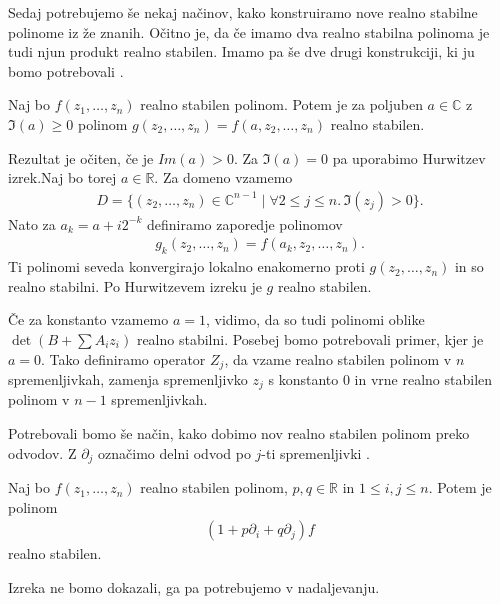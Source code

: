 Sedaj potrebujemo še nekaj načinov, kako konstruiramo nove realno stabilne polinome iz že znanih. Očitno je, da če imamo dva realno stabilna polinoma je tudi njun produkt realno stabilen. Imamo pa še dve drugi konstrukciji, ki ju bomo potrebovali \cite{wagner-multivariate}.
\begin{izrek}
    Naj bo \(f(z_1, \ldots, z_n)\) realno stabilen polinom. Potem je za poljuben \(a\in \mathbb C\) z \(\Im(a)\geq 0\) polinom \(g(z_2, \ldots, z_n) = f(a, z_2, \ldots, z_n)\) realno stabilen.
\end{izrek}
\begin{dokaz}
    Rezultat je očiten, če je \(Im(a) > 0\). Za \(\Im(a) = 0\) pa uporabimo Hurwitzev izrek.Naj bo torej \(a\in \mathbb R\). Za domeno vzamemo
    \begin{align*}
        D=\{(z_2,\ldots,z_n) \in \mathbb C^{n-1}\mid \forall 2\leq j \leq n.\, \Im(z_j)> 0\}.
    \end{align*}
    Nato za \(a_k = a + i 2^{-k}\) definiramo zaporedje polinomov
    \begin{align*}
        g_k(z_2, \ldots, z_n) = f(a_k, z_2, \ldots, z_n).
    \end{align*}
    Ti polinomi seveda konvergirajo lokalno enakomerno proti \(g(z_2, \ldots, z_n)\) in so realno stabilni. Po Hurwitzevem izreku je \(g\) realno stabilen.
\end{dokaz}
Če za konstanto vzamemo \(a=1\), vidimo, da so tudi polinomi oblike \(\det(B + \sum A_i z_i)\) realno stabilni.
Posebej bomo potrebovali primer, kjer je \(a = 0\). Tako definiramo operator \(Z_j\), da vzame realno stabilen polinom v \(n\) spremenljivkah, zamenja spremenljivko \(z_j\) s konstanto \(0\) in vrne realno stabilen polinom v \(n-1\) spremenljivkah.

Potrebovali bomo še način, kako dobimo nov realno stabilen polinom preko odvodov. Z \(\partial_j\) označimo delni odvod po \(j\)-ti spremenljivki \cite{Borcea_2010}.
\begin{izrek}
    Naj bo \(f(z_1, \ldots, z_n)\) realno stabilen polinom, \(p, q\in \mathbb R\) in \(1\leq i, j \leq n\). Potem je polinom
    \begin{align*}
        (1+p\partial_i + q\partial_j)f
    \end{align*}
    realno stabilen.
\end{izrek}
Izreka ne bomo dokazali, ga pa potrebujemo v nadaljevanju.

